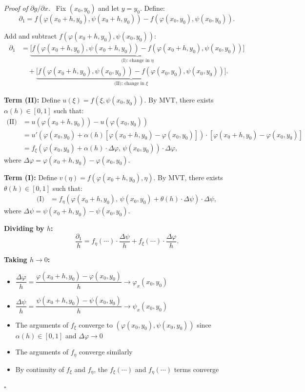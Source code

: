 \documentclass[11pt]{report}
\renewenvironment{proof}[1][Proof]{\par\noindent\textit{#1.}\ }{\hfill$\square$\par\medskip}
\begin{document}
\begin{proof}[Proof of $\partial g / \partial x$]
Fix $(x_0, y_0)$ and let $y = y_0$. Define:
\[
\partial_1 = f(\varphi(x_0 + h, y_0), \psi(x_0 + h, y_0)) - f(\varphi(x_0, y_0), \psi(x_0, y_0)).
\]

Add and subtract $f(\varphi(x_0 + h, y_0), \psi(x_0, y_0))$:
\begin{align*}
\partial_1 &= \underbrace{\bigl[f(\varphi(x_0+h,y_0), \psi(x_0+h,y_0)) - f(\varphi(x_0+h,y_0), \psi(x_0,y_0))\bigr]}_{\text{(I): change in } \eta} \\
&\quad + \underbrace{\bigl[f(\varphi(x_0+h,y_0), \psi(x_0,y_0)) - f(\varphi(x_0,y_0), \psi(x_0,y_0))\bigr]}_{\text{(II): change in } \xi}.
\end{align*}

\textbf{Term (II):} Define $u(\xi) = f(\xi, \psi(x_0, y_0))$. By MVT, there exists $\alpha(h) \in [0,1]$ such that:
\begin{align*}
\text{(II)} &= u(\varphi(x_0+h, y_0)) - u(\varphi(x_0, y_0)) \\
&= u'(\varphi(x_0, y_0) + \alpha(h)[\varphi(x_0+h, y_0) - \varphi(x_0, y_0)]) \cdot [\varphi(x_0+h, y_0) - \varphi(x_0, y_0)] \\
&= f_\xi(\varphi(x_0, y_0) + \alpha(h) \cdot \Delta\varphi, \, \psi(x_0, y_0)) \cdot \Delta\varphi,
\end{align*}
where $\Delta\varphi = \varphi(x_0+h, y_0) - \varphi(x_0, y_0)$.

\textbf{Term (I):} Define $v(\eta) = f(\varphi(x_0+h, y_0), \eta)$. By MVT, there exists $\theta(h) \in [0,1]$ such that:
\begin{align*}
\text{(I)} &= f_\eta(\varphi(x_0+h, y_0), \, \psi(x_0, y_0) + \theta(h) \cdot \Delta\psi) \cdot \Delta\psi,
\end{align*}
where $\Delta\psi = \psi(x_0+h, y_0) - \psi(x_0, y_0)$.

\textbf{Dividing by $h$:}
\[
\frac{\partial_1}{h} = f_\eta(\cdots) \cdot \frac{\Delta\psi}{h} + f_\xi(\cdots) \cdot \frac{\Delta\varphi}{h}.
\]

\textbf{Taking $h \to 0$:}
\begin{itemize}[itemsep=2pt]
    \item $\dfrac{\Delta\varphi}{h} = \dfrac{\varphi(x_0+h, y_0) - \varphi(x_0, y_0)}{h} \to \varphi_x(x_0, y_0)$
    \item $\dfrac{\Delta\psi}{h} = \dfrac{\psi(x_0+h, y_0) - \psi(x_0, y_0)}{h} \to \psi_x(x_0, y_0)$
    \item The arguments of $f_\xi$ converge to $(\varphi(x_0, y_0), \psi(x_0, y_0))$ since $\alpha(h) \in [0,1]$ and $\Delta\varphi \to 0$
    \item The arguments of $f_\eta$ converge similarly
    \item By continuity of $f_\xi$ and $f_\eta$, the $f_\xi(\cdots)$ and $f_\eta(\cdots)$ terms converge
\end{itemize}


\end{proof}
\end{document}
